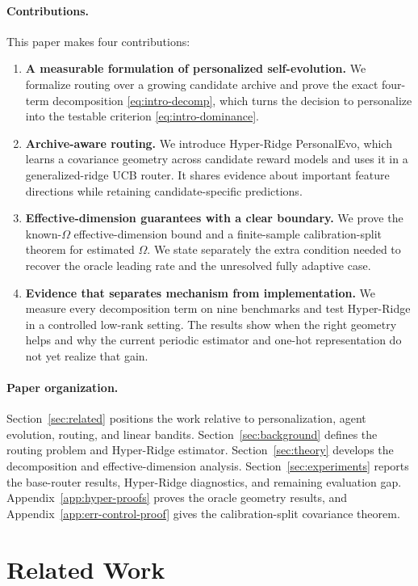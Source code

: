\documentclass{article} %
\begin{document}
\paragraph{Contributions.}
This paper makes four contributions:
\begin{enumerate}
\item \textbf{A measurable formulation of personalized self-evolution.} We formalize routing over a growing candidate archive and prove the exact four-term decomposition \eqref{eq:intro-decomp}, which turns the decision to personalize into the testable criterion \eqref{eq:intro-dominance}.
\item \textbf{Archive-aware routing.} We introduce Hyper-Ridge PersonalEvo, which learns a covariance geometry across candidate reward models and uses it in a generalized-ridge UCB router. It shares evidence about important feature directions while retaining candidate-specific predictions.
\item \textbf{Effective-dimension guarantees with a clear boundary.} We prove the known-$\Omega$ effective-dimension bound and a finite-sample calibration-split theorem for estimated $\Omega$. We state separately the extra condition needed to recover the oracle leading rate and the unresolved fully adaptive case.
\item \textbf{Evidence that separates mechanism from implementation.} We measure every decomposition term on nine benchmarks and test Hyper-Ridge in a controlled low-rank setting. The results show when the right geometry helps and why the current periodic estimator and one-hot representation do not yet realize that gain.
\end{enumerate}

\paragraph{Paper organization.}
Section~\ref{sec:related} positions the work relative to personalization, agent evolution, routing, and linear bandits. Section~\ref{sec:background} defines the routing problem and Hyper-Ridge estimator. Section~\ref{sec:theory} develops the decomposition and effective-dimension analysis. Section~\ref{sec:experiments} reports the base-router results, Hyper-Ridge diagnostics, and remaining evaluation gap. Appendix~\ref{app:hyper-proofs} proves the oracle geometry results, and Appendix~\ref{app:err-control-proof} gives the calibration-split covariance theorem.

\section{Related Work}
\end{document}
